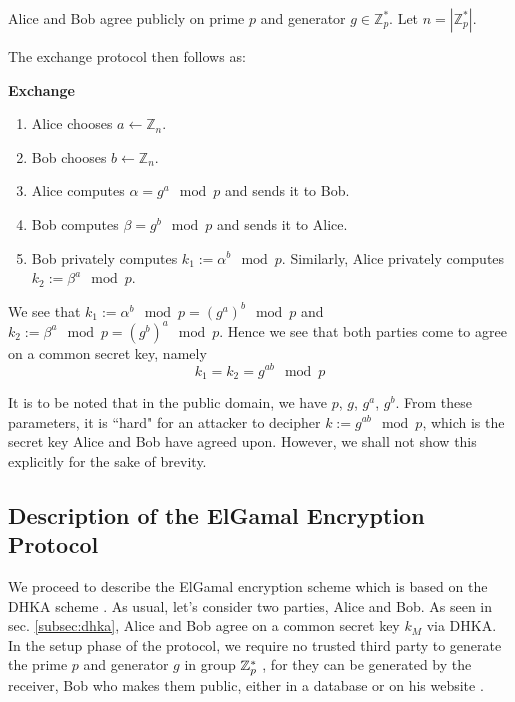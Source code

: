 Alice and Bob agree publicly on prime \( p \) and generator \( g \in \mathbb{Z}^*_p \). 
Let \( n = |\mathbb{Z}^*_p| \).

The exchange protocol then follows as:

\begin{tcolorbox}
\textbf{Exchange} 
\begin{enumerate}
    \item Alice chooses \( a \leftarrow \mathbb{Z}_n \). 
    \item Bob chooses \( b \leftarrow \mathbb{Z}_n \).
    \item Alice computes \( \alpha = g^a \mod p \) and sends it to Bob.
    \item Bob computes \( \beta = g^b \mod p \) and sends it to Alice.
    \item Bob privately computes \( k_1 := \alpha^b \mod p \). Similarly, Alice privately computes \( k_2 := \beta^a \mod p \).
\end{enumerate}
\end{tcolorbox}

We see that \( k_1 := \alpha^b \mod p = (g^a)^b \mod p \) and \( k_2 := \beta^a \mod p = (g^b)^a \mod p \). 
Hence we see that both parties come to agree on a common secret key, namely
\begin{equation}
    k_1 = k_2 = g^{ab} \mod p
\end{equation}

It is to be noted that in the public domain, we have \( p \), \( g \), \( g^a \), \( g^b \). 
From these parameters, it is ``hard" for an attacker to decipher \( k := g^{ab} \mod p\), which is the secret key Alice and Bob have agreed upon. 
However, we shall not show this explicitly for the sake of brevity.

\subsection{Description of the ElGamal Encryption Protocol}

\label{subsec:desc_elgamal}

We proceed to describe the ElGamal encryption scheme which is based on the DHKA scheme \cite{Elgamal_1985}. 
As usual, let's consider two parties, Alice and Bob. 
As seen in sec. \ref{subsec:dhka}, Alice and Bob agree on a common secret key \( k_M \) via DHKA.
In the setup phase of the protocol, we require no trusted third party to generate the prime \( p \) and generator \( g \) in group \( \mathbb{Z}^*_p \) , for they can be generated by the receiver, Bob who makes them public, either in a database or on his website \cite{paar2009understanding}.

